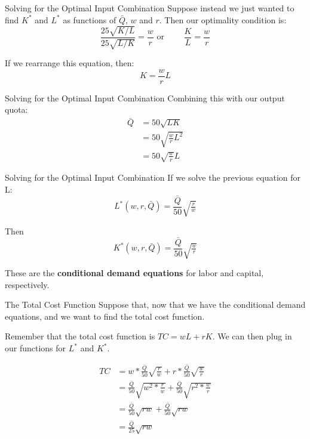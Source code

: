 \documentclass{beamer}
\begin{document}
\begin{frame}{Solving for the Optimal Input Combination}
  Suppose instead we just wanted to find  $K^*$ and $L^*$ as functions of $\bar{Q}$, $w$ and $r$. Then our optimality condition is:
  $$
    \frac{25\sqrt{K/L}}{25\sqrt{L/K}}=\frac{w}{r}
    \text{ or } \qquad \frac{K}{L}=\frac{w}{r}
  $$

  \bigskip
  If we rearrange this equation, then:
  $$ 
    K = \frac{w}{r}L
  $$ 
\end{frame}

\begin{frame}{Solving for the Optimal Input Combination}
Combining this with our output quota:
\begin{align*}
  \bar{Q} &= 50\sqrt{LK}             \\
          &= 50\sqrt{\tfrac{w}{r}L^2} \\
          &= 50\sqrt{\tfrac{w}{r}}L
\end{align*}
\end{frame}

\begin{frame}{Solving for the Optimal Input Combination}
  If we solve the previous equation for L:
  \begin{equation*}
    L^*(w,r,\bar{Q})=\frac{\bar{Q}}{50}\sqrt{\tfrac{r}{w}}
  \end{equation*}

  \bigskip
  Then
  \begin{equation*}
    K^*(w,r,\bar{Q}) =\frac{\bar{Q}}{50}\sqrt{\tfrac{w}{r}}
  \end{equation*}

  \bigskip
  These are the \textbf{conditional demand equations} for labor and capital, respectively.
\end{frame}

\begin{frame}{The Total Cost Function}
  Suppose that, now that we have the conditional demand equations, and we want to find the total cost function.

  \bigskip
  Remember that the total cost function is $TC = wL + rK$. We can then plug in our functions for $L^*$ and $K^*$.

  \vspace*{-5mm}
  \begin{align*}
    TC &= w*\frac{\bar{Q}}{50}\sqrt{\tfrac{r}{w}} + r*\frac{\bar{Q}}{50}\sqrt{\tfrac{w}{r}}     \\
       &= \frac{\bar{Q}}{50}\sqrt{w^2*\tfrac{r}{w}} + \frac{\bar{Q}}{50}\sqrt{r^2*\tfrac{w}{r}} \\
       &= \frac{\bar{Q}}{50}\sqrt{rw} + \frac{\bar{Q}}{50}\sqrt{rw}                             \\
       &= \frac{\bar{Q}}{25}\sqrt{rw}
  \end{align*}
\end{frame}
\end{document}
